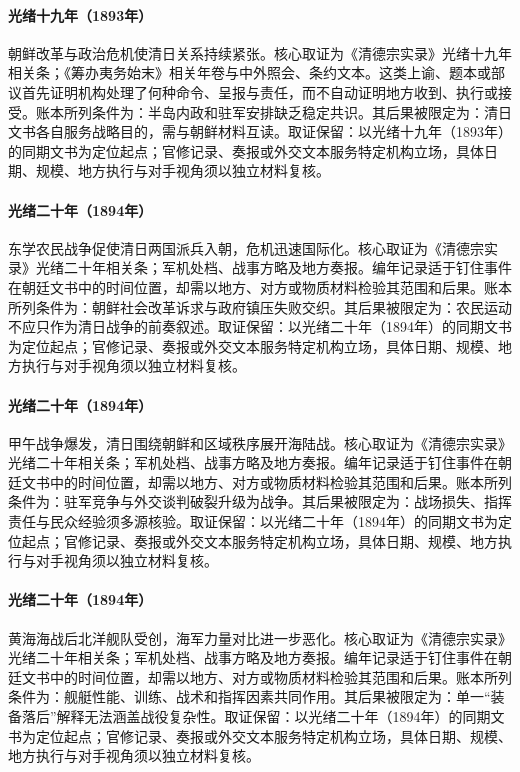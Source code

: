 \hypertarget{ledger:EQ-1893-KOREAN-REFORM-CRISIS}{}\paragraph{光绪十九年（1893年）}朝鲜改革与政治危机使清日关系持续紧张。核心取证为《清德宗实录》光绪十九年相关条；《筹办夷务始末》相关年卷与中外照会、条约文本。这类上谕、题本或部议首先证明机构处理了何种命令、呈报与责任，而不自动证明地方收到、执行或接受。账本所列条件为：半岛内政和驻军安排缺乏稳定共识。其后果被限定为：清日文书各自服务战略目的，需与朝鲜材料互读。取证保留：以光绪十九年（1893年）的同期文书为定位起点；官修记录、奏报或外交文本服务特定机构立场，具体日期、规模、地方执行与对手视角须以独立材料复核。
\hypertarget{ledger:EQ-1894-DONGHAK-PEASANT-WAR}{}\paragraph{光绪二十年（1894年）}东学农民战争促使清日两国派兵入朝，危机迅速国际化。核心取证为《清德宗实录》光绪二十年相关条；军机处档、战事方略及地方奏报。编年记录适于钉住事件在朝廷文书中的时间位置，却需以地方、对方或物质材料检验其范围和后果。账本所列条件为：朝鲜社会改革诉求与政府镇压失败交织。其后果被限定为：农民运动不应只作为清日战争的前奏叙述。取证保留：以光绪二十年（1894年）的同期文书为定位起点；官修记录、奏报或外交文本服务特定机构立场，具体日期、规模、地方执行与对手视角须以独立材料复核。
\hypertarget{ledger:EQ-1894-FIRST-SINO-JAPANESE-WAR}{}\paragraph{光绪二十年（1894年）}甲午战争爆发，清日围绕朝鲜和区域秩序展开海陆战。核心取证为《清德宗实录》光绪二十年相关条；军机处档、战事方略及地方奏报。编年记录适于钉住事件在朝廷文书中的时间位置，却需以地方、对方或物质材料检验其范围和后果。账本所列条件为：驻军竞争与外交谈判破裂升级为战争。其后果被限定为：战场损失、指挥责任与民众经验须多源核验。取证保留：以光绪二十年（1894年）的同期文书为定位起点；官修记录、奏报或外交文本服务特定机构立场，具体日期、规模、地方执行与对手视角须以独立材料复核。
\hypertarget{ledger:EQ-1894-YALU-NAVAL-BATTLE}{}\paragraph{光绪二十年（1894年）}黄海海战后北洋舰队受创，海军力量对比进一步恶化。核心取证为《清德宗实录》光绪二十年相关条；军机处档、战事方略及地方奏报。编年记录适于钉住事件在朝廷文书中的时间位置，却需以地方、对方或物质材料检验其范围和后果。账本所列条件为：舰艇性能、训练、战术和指挥因素共同作用。其后果被限定为：单一“装备落后”解释无法涵盖战役复杂性。取证保留：以光绪二十年（1894年）的同期文书为定位起点；官修记录、奏报或外交文本服务特定机构立场，具体日期、规模、地方执行与对手视角须以独立材料复核。
